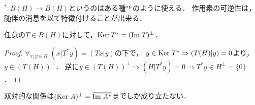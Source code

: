 \documentclass[uplatex,dvipdfmx]{jsreport}
\begin{document}
\begin{tcolorbox}[colframe=ForestGreen, colback=ForestGreen!10!white,breakable,colbacktitle=ForestGreen!40!white,coltitle=black,fonttitle=\bfseries\sffamily,
title=]
    ${}^*:B(H)\to B(H)$というのはある種${}^{\mathrm{op}}$のように使える．
    作用素の可逆性は，随伴の消息を以て特徴付けることが出来る．
\end{tcolorbox}

\begin{proposition}\label{prop-Ker-of-adjoint-operator}
    任意の$T\in B(H)$に対して，$\mathrm{Ker}\; T^*=(\mathrm{Im}\; T)^\perp$．
\end{proposition}
\begin{proof}
    $\forall_{x,y\in H}\;(x|T^*y)=(Tx|y)$の下で，
    $y\in\mathrm{Ker}\; T^*\Rightarrow (T(H)|y)=0$より，$y\in(T(H))^\perp$．
    逆に$y\in(T(H))^\perp\Rightarrow (H|T^*y)=0\Rightarrow T^*y\in H^\perp=\{0\}$．
\end{proof}
\begin{remark}
    双対的な関係は$(\Ker A)^\perp=\oo{\Im A^*}$までしか成り立たない．
\end{remark}
\end{document}
